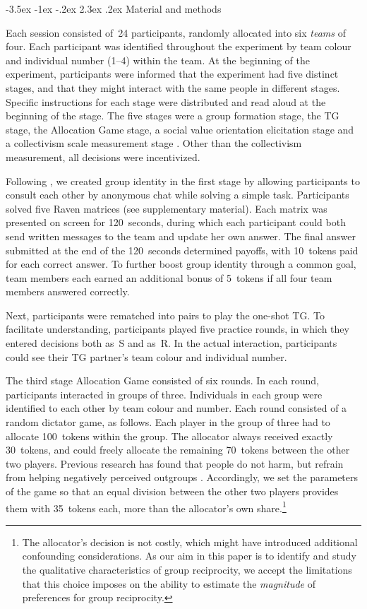\documentclass[12pt,a4paper]{article}\usepackage[]{graphicx}\usepackage[]{color}
\makeatletter
\renewcommand\section{\@startsection {section}{1}{\z@}%
{-3.5ex \@plus -1ex \@minus -.2ex}%
{2.3ex \@plus.2ex}%
{\bf\sffamily\Large}}
\makeatother
\begin{document}
\section{Material and methods}
\label{sec:design}

Each session consisted of~24 participants, randomly allocated into six
\emph{teams} of four. Each participant was identified throughout the experiment
by team colour and individual number (1--4) within the team. At the beginning of
the experiment, participants were informed that the experiment had five distinct
stages, and that they might interact with the same people in different stages.
Specific instructions for each stage were distributed and read aloud at the
beginning of the stage. The five stages were a group formation stage, the TG
stage, the Allocation Game stage, a social value orientation elicitation stage
\citep*{murphy2011measuring} and a collectivism scale measurement stage
\citep*[adapted from the horizontal collectivism scale
in][]{Singelis1995horizontal}. Other than the collectivism measurement, all decisions were incentivized.

Following \citep{chen2009group}, we created group identity in the
first stage by allowing participants to consult each other by anonymous
chat while solving a simple task. Participants solved five Raven matrices
(see supplementary material). Each matrix was presented on screen
for 120~seconds, during which each participant could both send written
messages to the team and update her own answer. The final answer submitted
at the end of the 120~seconds determined payoffs, with 10~tokens
paid for each correct answer. To further boost group identity through
a common goal, team members each earned an additional bonus of 5~tokens
if all four team members answered correctly.

Next, participants were rematched into pairs to play the one-shot
TG. To facilitate understanding, participants played five practice
rounds, in which they entered decisions both as~S and as~R. In the
actual interaction, participants could see their TG partner's team
colour and individual number. 

The third stage Allocation Game consisted of six rounds. In each round, participants interacted in groups of three. Individuals in each group were identified to each other by
team colour and number. Each round consisted of a random dictator game, as
follows. Each player in the group of three had to allocate 100~tokens within the
group. The allocator always received exactly 30~tokens, and could freely allocate the
remaining 70~tokens between the other two players. Previous research has found that
people do not harm, but refrain from helping negatively perceived outgroups
\citep{weisel2015ingroup}. Accordingly, we set the parameters of the game so
that an equal division between the other two players provides them with 35~tokens each, more than the allocator's own share.\footnote{
  The allocator's decision is not costly, which might have introduced additional confounding considerations. As our aim in this paper is to identify and study the qualitative characteristics of group reciprocity, we accept the limitations that this choice imposes on the ability to estimate the \emph{magnitude} of preferences for group reciprocity. 
}
\end{document}
